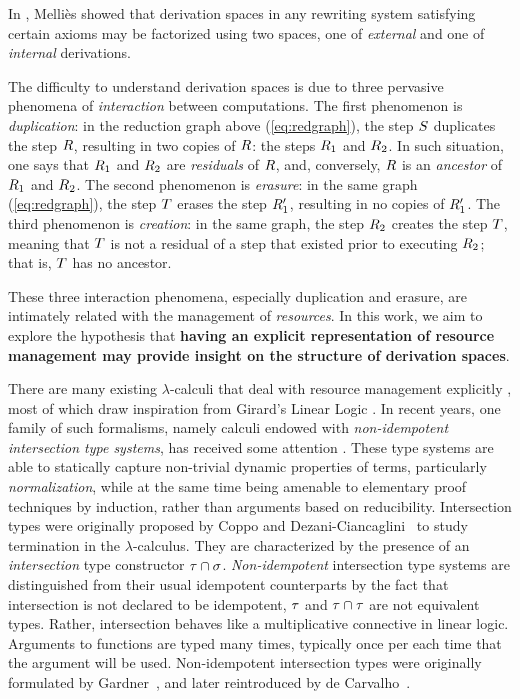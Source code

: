 In \cite{DBLP:conf/ctcs/Mellies97}, Melli\`es showed that
derivation spaces in any rewriting system satisfying certain axioms
may be factorized using two spaces,
one of {\em external} and one of {\em internal} derivations.



The difficulty to understand derivation spaces is due to three pervasive phenomena
of \emph{interaction} between computations.
The first phenomenon is \emph{duplication}:
in the reduction graph above (\ref{eq:redgraph}), the step $S$ duplicates the step $R$,
resulting in two copies of $R$: the steps $R_1$ and $R_2$.
In such situation, one says that $R_1$ and $R_2$ are \emph{residuals} of $R$,
and, conversely, $R$ is an \emph{ancestor} of $R_1$ and $R_2$.
The second phenomenon is \emph{erasure}:
in the same graph (\ref{eq:redgraph}), the step $T$ erases the step $R'_1$,
resulting in no copies of $R'_1$.
The third phenomenon is \emph{creation}:
in the same graph, the step $R_2$ creates the step $T$,
meaning that $T$ is not a residual of a step that existed prior
to executing $R_2$; that is, $T$ has no ancestor.

These three interaction phenomena, especially duplication and erasure,
are intimately related with the management of \emph{resources}.
In this work, we aim to explore the hypothesis that {\bf having an explicit
representation of resource management may provide insight on
the structure of derivation spaces}.

There are many existing $\lambda$-calculi that deal with resource management explicitly
\cite{boudol1993lambda,ehrhard2003differential,kesner2007resource,kesner2009prismoid},
most of which draw inspiration from Girard's Linear Logic \cite{girard1987linear}.
In recent years, one family of such formalisms, namely calculi endowed with
{\em non-idempotent intersection type systems},
has received some attention
\cite{ehrhard2012collapsing,bernadet2013non,bucciarelli2014inhabitation,bucciarelli2017non,kesner2016reasoning,thesisvial,KRV18}.
These type systems are able to statically capture non-trivial
dynamic properties of terms, particularly {\em normalization},
while at the same time being amenable to elementary proof techniques by induction,
rather than arguments based on reducibility.
Intersection types were originally proposed by
Coppo and Dezani-Ciancaglini~\cite{DBLP:journals/aml/CoppoD78}
to study termination in the $\lambda$-calculus.
They are characterized by the presence of an {\em intersection} type constructor $\tau \cap \sigma$.
{\em Non-idempotent} intersection type systems are distinguished from their usual idempotent
counterparts by the fact that intersection
is not declared to be idempotent, \ie $\tau$ and $\tau \cap \tau$ are not equivalent types.
Rather, intersection behaves like a multiplicative connective in linear logic.
Arguments to functions are typed many times, typically once
per each time that the argument will be used.
Non-idempotent intersection types were originally formulated by
Gardner~\cite{gardner1994discovering},
and later reintroduced by de Carvalho~\cite{carvalho2007semantiques}.

